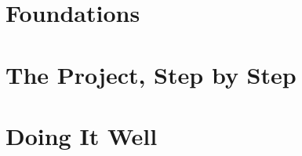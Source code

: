 \documentclass[11pt,a4paper,twoside=false,open=any,parskip=false,
               headings=standardclasses,numbers=noenddot]{scrreprt}
\begin{document}


\tableofcontents

\cleardoublepage
{}
\part{Foundations}\label{part:foundations}




\part{The Project, Step by Step}\label{part:project}








\part{Doing It Well}\label{part:doingitwell}




\appendix
{}







\cleardoublepage
\printbibliography[heading=bibintoc,title={Bibliography}]
\end{document}
